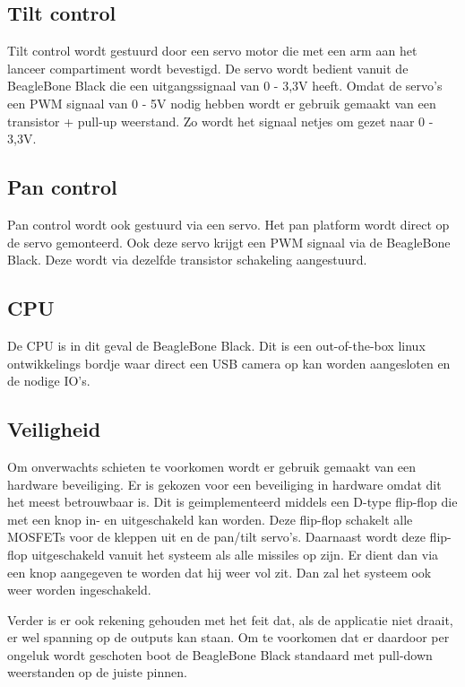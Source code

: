 \begin{cppcode}
\begin{cppcode}
\subsection{Tilt control}
\label{sub:tiltContr}
Tilt control wordt gestuurd door een servo motor die met een arm aan het lanceer
compartiment wordt bevestigd. De servo wordt bedient vanuit de BeagleBone Black die een
uitgangssignaal van 0 - 3,3V heeft. Omdat de servo's een PWM signaal van 0 - 5V nodig
hebben wordt er gebruik gemaakt van een transistor + pull-up weerstand. Zo wordt het
signaal netjes om gezet naar 0 - 3,3V.

\subsection{Pan control}
\label{sub:panContr}
Pan control wordt ook gestuurd via een servo. Het pan platform wordt direct op de servo
gemonteerd. Ook deze servo krijgt een PWM signaal via de BeagleBone Black. Deze wordt
via dezelfde transistor schakeling aangestuurd.

\subsection{CPU}
\label{sub:cpu}
De CPU is in dit geval de BeagleBone Black. Dit is een out-of-the-box linux ontwikkelings
bordje waar direct een USB camera op kan worden aangesloten en de nodige IO's.

\subsection{Veiligheid}
\label{sub:veiligheid}
Om onverwachts schieten te voorkomen wordt er gebruik gemaakt van een hardware beveiliging.
Er is gekozen voor een beveiliging in hardware omdat dit het meest betrouwbaar is. Dit is
geimplementeerd middels een D-type flip-flop die met een knop in- en uitgeschakeld kan
worden. Deze flip-flop schakelt alle MOSFETs voor de kleppen uit en de pan/tilt servo's.
Daarnaast wordt deze flip-flop uitgeschakeld vanuit het systeem als alle missiles op zijn.
Er dient dan via een knop aangegeven te worden dat hij weer vol zit. Dan zal het systeem
ook weer worden ingeschakeld.

Verder is er ook rekening gehouden met het feit dat, als de applicatie niet draait, er wel
spanning op de outputs kan staan. Om te voorkomen dat er daardoor per ongeluk wordt geschoten
boot de BeagleBone Black standaard met pull-down weerstanden op de juiste pinnen.


\end{cppcode}
\end{cppcode}
